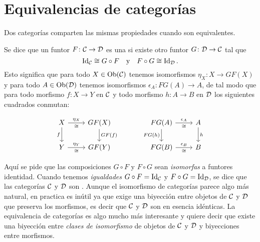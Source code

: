 \documentclass{article}
\numberwithin{equation}{section}
\theoremstyle{definition}
\begin{document}

\section{Equivalencias de categorías}


Dos categorías comparten las mismas propiedades cuando son equivalentes.

\begin{definicion}
  Se dice que un funtor $F\colon \mathcal{C}\to \mathcal{D}$ es una
   si existe otro funtor
  $G\colon \mathcal{D}\to \mathcal{C}$ tal que
  $$\operatorname{Id}_\mathcal{C} \cong G\circ F \quad\text{y}\quad F\circ G \cong \operatorname{Id}_\mathcal{D}.$$
  Esto significa que para todo $X\in \operatorname{Ob} (\mathcal{C})$ tenemos isomorfismos
  $\eta_X\colon X\to G F (X)$ y para todo $A\in \operatorname{Ob} (\mathcal{D})$ tenemos
  isomorfismos $\epsilon_A\colon FG (A) \to A$, de tal modo que para todo
  morfismo $f\colon X\to Y$ en $\mathcal{C}$ y todo morfismo $h\colon A\to B$ en
  $\mathcal{D}$ los siguientes cuadrados conmutan:

  \[ \begin{tikzcd}
      X \ar{r}{\eta_X}[swap]{\isom}\ar{d}[swap]{f} & G F (X) \ar{d}{GF (f)} & & F G (A)\ar{r}{\epsilon_A}[swap]{\isom}\ar{d}[swap]{FG (h)} & A\ar{d}{h} \\
      Y \ar{r}{\eta_Y}[swap]{\isom} & G F (Y) & & F G (B) \ar{r}{\epsilon_B}[swap]{\isom} & B
    \end{tikzcd} \]
\end{definicion}

Aquí se pide que las composiciones $G\circ F$ y $F\circ G$ sean \emph{isomorfas}
a funtores identidad. Cuando tenemos \emph{igualdades}
$G\circ F = \operatorname{Id}_\mathcal{C}$ y $F\circ G = \operatorname{Id}_\mathcal{D}$, se dice que las
categorías $\mathcal{C}$ y $\mathcal{D}$ son . Aunque el
isomorfismo de categorías parece algo más natural, en practica es inútil ya que
exige una biyección entre objetos de $\mathcal{C}$ y $\mathcal{D}$ que preserva
los morfismos, es decir que $\mathcal{C}$ y $\mathcal{D}$ son en esencia
idénticas. La equivalencia de categorías es algo mucho más interesante y quiere
decir que existe una biyección entre \emph{clases de isomorfismo} de objetos de
$\mathcal{C}$ y $\mathcal{D}$ y biyecciones entre morfismos.
\end{document}
